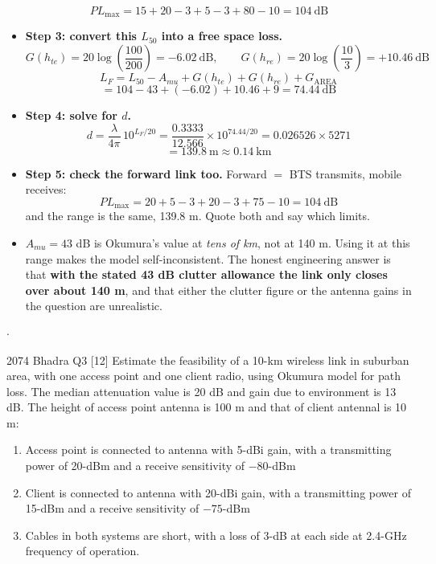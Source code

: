 \[ PL_{\max} = 15 + 20 - 3 + 5 - 3 + 80 - 10 = \boxed{104\ \text{dB}} \]

\begin{itemize}
  \item \textbf{Step 3: convert this $L_{50}$ into a free space loss.}
        \[ G(h_{te}) = 20\log\!\left(\frac{100}{200}\right) = -6.02\ \text{dB},
           \qquad G(h_{re}) = 20\log\!\left(\frac{10}{3}\right) = +10.46\ \text{dB} \]
        \[ L_F = L_{50} - A_{mu} + G(h_{te}) + G(h_{re}) + G_{\text{AREA}} \]
        \[ = 104 - 43 + (-6.02) + 10.46 + 9 = 74.44\ \text{dB} \]
  \item \textbf{Step 4: solve for $d$.}
        \[ d = \frac{\lambda}{4\pi}\,10^{L_F/20}
             = \frac{0.3333}{12.566} \times 10^{74.44/20}
             = 0.026526 \times 5271 \]
        \[ = \boxed{139.8\ \text{m} \approx 0.14\ \text{km}} \]
  \item \textbf{Step 5: check the forward link too.} Forward $=$ BTS transmits, mobile receives:
        \[ PL_{\max} = 20 + 5 - 3 + 20 - 3 + 75 - 10 = 104\ \text{dB} \]
         and the range is the same,
        139.8 m. Quote both and say which limits.
  \item {} $A_{mu} = 43$ dB is Okumura's value at
        \emph{tens of km}, not at 140 m. Using it at this range makes the model self-inconsistent.
        The honest engineering answer is that \textbf{with the stated 43 dB clutter allowance the
        link only closes over about 140 m}, and that either the clutter figure or the antenna
        gains in the question are unrealistic.
\end{itemize}

\hr

{\color{sub}\footnotesize {}  \gap$\cdot$\gap
{}}

\begin{asked}{2074 Bhadra \textperiodcentered{} Q3 \textperiodcentered{} [12]}
Estimate the feasibility of a 10-km wireless link in suburban area, with one access point and
one client radio, using Okumura model for path loss. The median attenuation value is 20 dB and
gain due to environment is 13 dB. The height of access point antenna is 100 m and that of client
antennal is 10 m:
\begin{enumerate}[label=\alph*., leftmargin=1.7em]
  \item Access point is connected to antenna with 5-dBi gain, with a transmitting power of
        20-dBm and a receive sensitivity of $-80$-dBm
  \item Client is connected to antenna with 20-dBi gain, with a transmitting power of 15-dBm and
        a receive sensitivity of $-75$-dBm
  \item Cables in both systems are short, with a loss of 3-dB at each side at 2.4-GHz frequency
        of operation.
\end{enumerate}
\end{asked}

